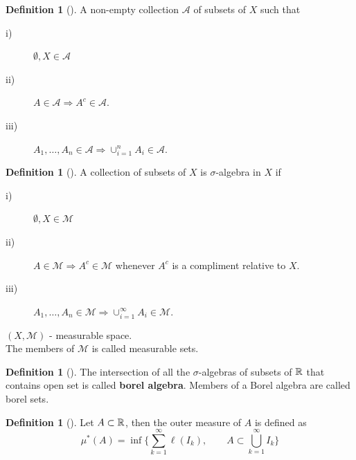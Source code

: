 \documentclass[	DIV=calc,paper=a4,fontsize=11pt]{scrartcl}	 	%
\theoremstyle{definition}
\newtheorem{defn}[thm]{Definition}
\theoremstyle{plain}
\theoremstyle{remark}
\begin{document}
\begin{defn}[\textbf{\color{blue}{Algebra}}] A non-empty collection $\mathcal{A}$ of subsets of $X$ such that
\begin{description}
  \item[i)] $\emptyset,X\in \mathcal{A}$
  \item[ii)] $A\in \mathcal{A}\Rightarrow A^c\in \mathcal{A}.$
  \item[iii)]$A_1,\ldots,A_n\in\mathcal{A}\Rightarrow \cup_{i=1}^{n}A_i\in \mathcal{A}.$
\end{description}
\end{defn}

\begin{defn}[\textbf{\color{blue}{$\sigma$-algebra}}] A collection of subsets of $X$ is $\sigma$-algebra in $X$ if
\begin{description}
  \item[i)] $\emptyset,X\in \mathcal{M}$
  \item[ii)] $A\in\mathcal{M}\Rightarrow A^c\in \mathcal{M}$ whenever $A^c$ is a compliment relative to $X$.
  \item[iii)] $A_1,\ldots,A_n\in \mathcal{M}\Rightarrow \cup_{i=1}^{\infty}A_i\in \mathcal{M}.$
\end{description}
\end{defn}
$(X,\mathcal{M})$ - measurable space.\\
The members of $\mathcal{M}$ is called measurable sets.

\begin{defn}[\textbf{\color{blue}{Borel set}}]
The intersection of all the $\sigma$-algebras of subsets of $\Bbb R$ that contains open set is called \textbf{borel algebra}. Members of a Borel algebra are called borel sets.
\end{defn}

\begin{defn}[\textbf{\color{blue}{Outer measure}}]
Let $A\subset \Bbb R$, then the outer measure of $A$ is defined as
\[\mu^*(A)=\inf \biggl\{\sum_{k=1}^{\infty}\ell(I_k), \qquad A\subset \bigcup_{k=1}^{\infty}I_k\biggl\}\]
\end{defn}
\end{document}
